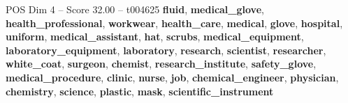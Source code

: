 \begin{textsample}{POS Dim 4 – Score 32.00 – t004625}  \label{ex:f4_pos_004}
\textbf{fluid}, \textbf{medical\_glove}, \textbf{health\_professional}, \textbf{workwear}, \textbf{health\_care}, \textbf{medical}, \textbf{glove}, \textbf{hospital}, \textbf{uniform}, \textbf{medical\_assistant}, \textbf{hat}, \textbf{scrubs}, \textbf{medical\_equipment}, \textbf{laboratory\_equipment}, \textbf{laboratory}, \textbf{research}, \textbf{scientist}, \textbf{researcher}, \textbf{white\_coat}, \textbf{surgeon}, \textbf{chemist}, \textbf{research\_institute}, \textbf{safety\_glove}, \textbf{medical\_procedure}, \textbf{clinic}, \textbf{nurse}, \textbf{job}, \textbf{chemical\_engineer}, \textbf{physician}, \textbf{chemistry}, \textbf{science}, \textbf{plastic}, \textbf{mask}, \textbf{scientific\_instrument}

\end{textsample}
